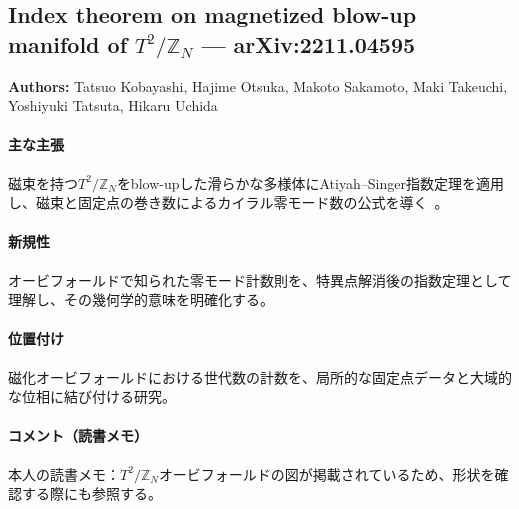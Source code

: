 \subsection{Index theorem on magnetized blow-up manifold of $T^2/\mathbb{Z}_N$ --- arXiv:2211.04595}

\textbf{Authors:} Tatsuo Kobayashi, Hajime Otsuka, Makoto Sakamoto, Maki Takeuchi, Yoshiyuki Tatsuta, Hikaru Uchida

\paragraph{主な主張}
磁束を持つ$T^2/\mathbb{Z}_N$をblow-upした滑らかな多様体にAtiyah--Singer指数定理を適用し、磁束と固定点の巻き数によるカイラル零モード数の公式を導く~\cite{Kobayashi:2022tti}。

\paragraph{新規性}
オービフォールドで知られた零モード計数則を、特異点解消後の指数定理として理解し、その幾何学的意味を明確化する。

\paragraph{位置付け}
磁化オービフォールドにおける世代数の計数を、局所的な固定点データと大域的な位相に結び付ける研究。

\paragraph{コメント（読書メモ）}
本人の読書メモ：$T^2/\mathbb{Z}_N$オービフォールドの図が掲載されているため、形状を確認する際にも参照する。
